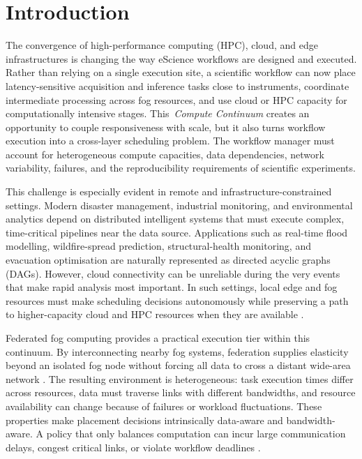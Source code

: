 \section{Introduction}

The convergence of high-performance computing (HPC), cloud, and edge infrastructures is changing the way eScience workflows are designed and executed. Rather than relying on a single execution site, a scientific workflow can now place latency-sensitive acquisition and inference tasks close to instruments, coordinate intermediate processing across fog resources, and use cloud or HPC capacity for computationally intensive stages. This \,\emph{Compute Continuum} creates an opportunity to couple responsiveness with scale, but it also turns workflow execution into a cross-layer scheduling problem. The workflow manager must account for heterogeneous compute capacities, data dependencies, network variability, failures, and the reproducibility requirements of scientific experiments.

This challenge is especially evident in remote and infrastructure-constrained settings. Modern disaster management, industrial monitoring, and environmental analytics depend on distributed intelligent systems that must execute complex, time-critical pipelines near the data source. Applications such as real-time flood modelling, wildfire-spread prediction, structural-health monitoring, and evacuation optimisation are naturally represented as directed acyclic graphs (DAGs). However, cloud connectivity can be unreliable during the very events that make rapid analysis most important. In such settings, local edge and fog resources must make scheduling decisions autonomously while preserving a path to higher-capacity cloud and HPC resources when they are available \cite{wang2021adaptive,dragoni2017microservices}.

Federated fog computing provides a practical execution tier within this continuum. By interconnecting nearby fog systems, federation supplies elasticity beyond an isolated fog node without forcing all data to cross a distant wide-area network \cite{mattia2023fogcontrol,fgcs2024}. The resulting environment is heterogeneous: task execution times differ across resources, data must traverse links with different bandwidths, and resource availability can change because of failures or workload fluctuations. These properties make placement decisions intrinsically data-aware and bandwidth-aware. A policy that only balances computation can incur large communication delays, congest critical links, or violate workflow deadlines \cite{salehi2016robust}.

